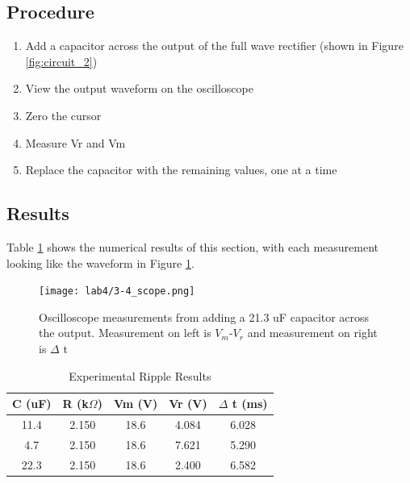 \documentclass[12pt,letterpaper]{report}
\begin{document}
\subsection*{Procedure}

\begin{enumerate}
\item Add a capacitor across the output of the full wave rectifier (shown in Figure \ref{fig:circuit_2})
\item View the output waveform on the oscilloscope
\item Zero the cursor
\item Measure Vr and Vm
\item Replace the capacitor with the remaining values, one at a time
\end{enumerate}

\subsection*{Results}
Table \ref{table:ripple_results} shows the numerical results of this section, with each measurement looking like the waveform in Figure \ref{fig:3-4_scope}. 
\begin{figure}[H]
\centering
\texttt{[image: lab4/3-4\_scope.png]}
\caption{Oscilloscope measurements from adding a 21.3 uF capacitor across the output. Measurement on left is $V_m$-$V_r$ and measurement on right is $\Delta$ t}
\label{fig:3-4_scope}
\end{figure}

\begin{table}[ht]
\caption{Experimental Ripple Results} %
\centering 
    \begin{tabular}{| c | c | c | c | c |}
    \hline  
    C (uF) & R (k$\Omega$) & Vm (V) & Vr (V) & $\Delta$ t (ms)\\
    \hline
    11.4 & 2.150 & 18.6 & 4.084 & 6.028 \\
    4.7 & 2.150 & 18.6 & 7.621 & 5.290 \\
    22.3 & 2.150 & 18.6 &  2.400 & 6.582 \\
    \hline
    \end{tabular}
    \label{table:ripple_results}
\end{table}

\end{document}
